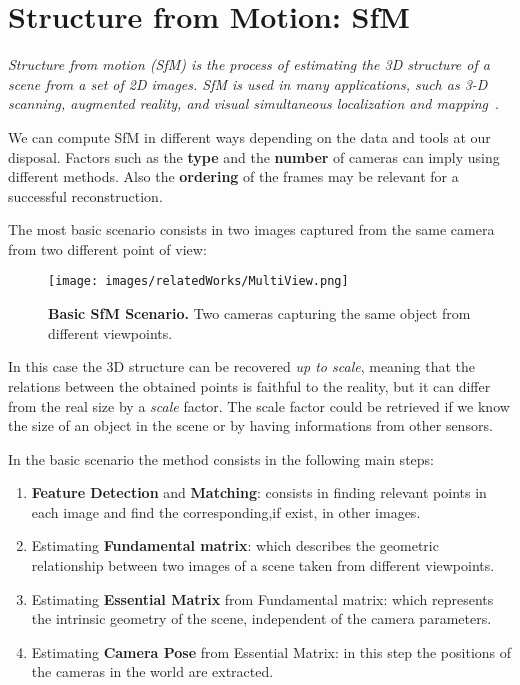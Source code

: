 \section{Structure from Motion: SfM}\label{sec:sfm}
\textit{Structure from motion (SfM) is the process of estimating the 3D
structure of a scene from a set of 2D images. SfM is used in many
applications, such as 3-D scanning, augmented reality, and visual
simultaneous localization and mapping}~\cite{sfm_matlab}.

We can compute SfM in different ways depending on the data and tools at our disposal.
Factors such as the \textbf{type} and the \textbf{number} of cameras can imply using different methods. Also 
the \textbf{ordering} of the frames may be relevant for a successful reconstruction.

The most basic scenario consists in two images captured from the same camera from two different point of view:
\begin{figure}[H]
    \centering
    \texttt{[image: images/relatedWorks/MultiView.png]} 
    \caption{\textbf{Basic SfM Scenario.} Two cameras capturing the same object from different viewpoints.}
    \label{fig:sfm_basic}
\end{figure}
 In this case the 3D structure can be recovered \textit{up to scale}, meaning that the relations between the obtained
 points is faithful to the reality, but it can differ from the real size by a \textit{scale} factor. The scale factor
 could be retrieved if we know the size of an object in the scene or by having informations from other sensors.

 In the basic scenario the method consists in the following main steps:
 \begin{enumerate}
    \item \textbf{Feature Detection} and \textbf{Matching}: consists in finding relevant points in each image and find the corresponding,if exist, in other images.
    \item Estimating \textbf{Fundamental matrix}: which describes the geometric relationship between two images of a scene taken from different viewpoints. 
    \item Estimating \textbf{Essential Matrix} from Fundamental matrix: which represents the intrinsic geometry of the scene, independent of the camera parameters.
    \item Estimating \textbf{Camera Pose} from Essential Matrix: in this step the positions of the cameras in the world are extracted.
 \end{enumerate}

